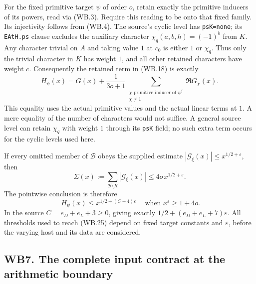 For the fixed primitive target $\psi$ of order $o$, retain exactly
the primitive inducers of its powers, read via (WB.3). Require this
reading to be onto that fixed family. Its injectivity follows from
(WB.4). The source's cyclic level has \texttt{psK=none}; its
\texttt{EAtH.ps} clause excludes the auxiliary character
$\chi_q(a,b,h)=(-1)^b$ from $K$.
Any character trivial on $A$ and taking value $1$ at $c_0$ is
either $1$ or $\chi_q$. Thus only the trivial character in $K$ has
weight $1$, and all other retained characters have weight $c$.
Consequently the retained term in (WB.18) is exactly
\[
 H_\psi(x)=G(x)+\frac1{3o+1}
       \sum_{\substack{\chi\text{ primitive inducer of }\psi^j\\\chi\ne1}}
                                             \Re G_\chi(x).
 \tag{WB.24}
\]
This equality uses the actual primitive values and the actual linear
terms at $1$. A mere equality of the number of characters would not
suffice. A general source level can retain $\chi_q$ with weight
$1$ through its \texttt{psK} field; no such extra term occurs for
the cyclic levels used here.

If every omitted member of $\mathcal B$ obeys the supplied estimate
$|\mathcal G_\xi(x)|\le x^{1/2+\varepsilon}$, then
\[
 \Sigma(x):=\sum_{\mathcal B\setminus K}|\mathcal G_\xi(x)|
                  \le4o\,x^{1/2+\varepsilon}.
\]
The pointwise conclusion is therefore
\[
 \boxed{\ H_\psi(x)\le x^{1/2+(C+4)\varepsilon}\ }
 \quad\text{when }x^\varepsilon\ge1+4o.
 \tag{WB.25}
\]
In the source $C=e_D+e_L+3\ge0$, giving exactly
$1/2+(e_D+e_L+7)\varepsilon$. All thresholds used to reach
(WB.25) depend on fixed target constants and $\varepsilon$, before
the varying host and its data are considered.

\subsection{WB7. The complete input contract at the arithmetic boundary}

